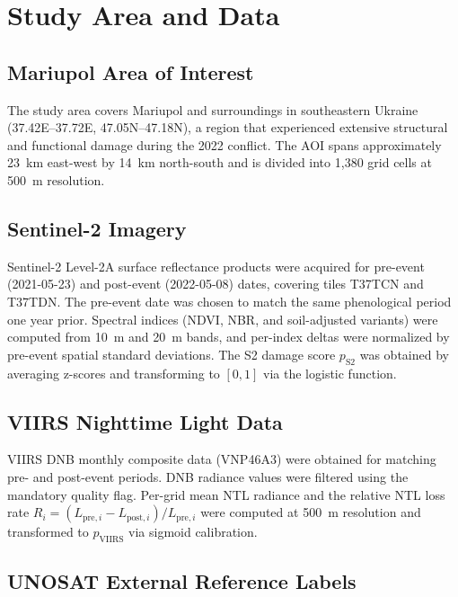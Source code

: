\documentclass[wcp]{jmlr}
\begin{document}
\section{Study Area and Data}\label{sec:data}

\subsection{Mariupol Area of Interest}

The study area covers Mariupol and surroundings in southeastern Ukraine
(37.42\textdegree{}E--37.72\textdegree{}E, 47.05\textdegree{}N--47.18\textdegree{}N),
a region that experienced extensive structural and functional damage during
the 2022 conflict. The AOI spans approximately 23~km east-west by 14~km
north-south and is divided into 1{,}380 grid cells at 500~m resolution.

\subsection{Sentinel-2 Imagery}

Sentinel-2 Level-2A surface reflectance products were acquired for
pre-event (2021-05-23) and post-event (2022-05-08) dates, covering tiles
T37TCN and T37TDN. The pre-event date was chosen to match the same
phenological period one year prior. Spectral indices (NDVI, NBR, and
soil-adjusted variants) were computed from 10~m and 20~m bands, and per-index
deltas were normalized by pre-event spatial standard deviations. The S2
damage score $p_{\text{S2}}$ was obtained by averaging z-scores and
transforming to $[0,1]$ via the logistic function.

\subsection{VIIRS Nighttime Light Data}

VIIRS DNB monthly composite data (VNP46A3) were obtained for matching pre-
and post-event periods. DNB radiance values were filtered using the
mandatory quality flag. Per-grid mean NTL radiance and the relative NTL
loss rate $R_i = (L_{\text{pre},i} - L_{\text{post},i})/L_{\text{pre},i}$
were computed at 500~m resolution and transformed to $p_{\text{VIIRS}}$ via
sigmoid calibration.

\subsection{UNOSAT External Reference Labels}
\end{document}
